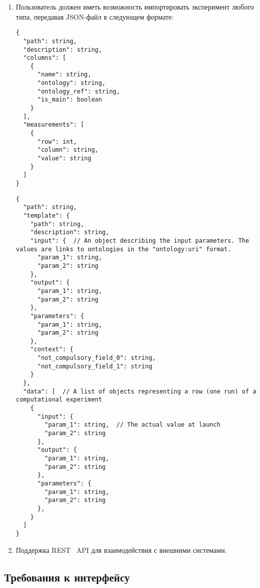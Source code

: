 \documentclass[a4paper,12pt,reqno]{article}
\begin{document}
\begin{enumerate}
        \begin{enumerate}[label=\arabic{enumi}.\arabic*.]
            \item Пользователь должен иметь возможность импортировать эксперимент любого типа, передавая JSON-файл в следующем формате:
            \begin{lstlisting}[frame=single, basicstyle=\footnotesize\ttfamily, label={lst:lab_import}, caption={Формат данных для импорта лабораторого эксперимента},captionpos=b, breaklines=true, breakatwhitespace=true]
{
  "path": string,
  "description": string,
  "columns": [
    {
      "name": string,
      "ontology": string,
      "ontology_ref": string,
      "is_main": boolean
    }
  ],
  "measurements": [
    {
      "row": int,
      "column": string,
      "value": string
    }
  ]
}
            \end{lstlisting}
            \begin{lstlisting}[frame=single, basicstyle=\footnotesize\ttfamily, label={lst:comp_import}, caption={Формат данных для импорта вычислительного эксперимента},captionpos=b, breaklines=true, breakatwhitespace=true]
{
  "path": string,
  "template": {
    "path": string,
    "description": string,
    "input": {  // An object describing the input parameters. The values are links to ontologies in the "ontology:uri" format.
      "param_1": string,
      "param_2": string
    },
    "output": {
      "param_1": string,
      "param_2": string
    },
    "parameters": {
      "param_1": string,
      "param_2": string
    },
    "context": {
      "not_compulsory_field_0": string,
      "not_compulsory_field_1": string
    }
  },
  "data": [  // A list of objects representing a row (one run) of a computational experiment
    {
      "input": {
        "param_1": string,  // The actual value at launch
        "param_2": string
      },
      "output": {
        "param_1": string,
        "param_2": string
      },
      "parameters": {
        "param_1": string,
        "param_2": string
      },
    }
  ]
}
            \end{lstlisting}
            \item Поддержка REST~\cite{arch:REST} API для взаимодействия с внешними системами.
        \end{enumerate}
    \end{enumerate}

    \subsection{Требования к интерфейсу}
\end{document}

